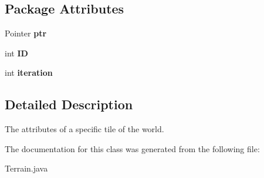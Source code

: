 \subsection*{Package Attributes}
\begin{CompactItemize}
\item 
\hypertarget{classTerrain_f84362b39e46540c255dcf458f2afc66}{
Pointer \textbf{ptr}}
\label{classTerrain_f84362b39e46540c255dcf458f2afc66}

\item 
\hypertarget{classTerrain_1fcb4e3ebd86107c27367eee2b735a29}{
int \textbf{ID}}
\label{classTerrain_1fcb4e3ebd86107c27367eee2b735a29}

\item 
\hypertarget{classTerrain_9596057c119a4be28a50acaa68af2539}{
int \textbf{iteration}}
\label{classTerrain_9596057c119a4be28a50acaa68af2539}

\end{CompactItemize}


\subsection{Detailed Description}
The attributes of a specific tile of the world. 

The documentation for this class was generated from the following file:\begin{CompactItemize}
\item 
Terrain.java\end{CompactItemize}
